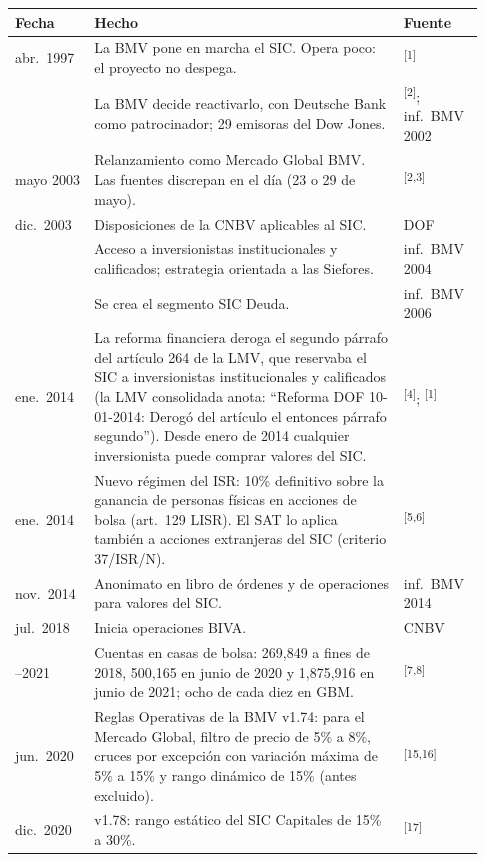 \documentclass[11pt,letterpaper]{article}
\theoremstyle{definition}
\theoremstyle{plain}
\newcommand{\web}[1]{\textsuperscript{[#1]}}
\begin{document}
\begin{center}\small
\begin{longtable}{@{}>{\raggedright\arraybackslash}p{0.15\linewidth}>{\raggedright\arraybackslash}p{0.62\linewidth}>{\raggedright\arraybackslash}p{0.16\linewidth}@{}}\toprule
Fecha & Hecho & Fuente\\\midrule\endhead
14 abr.\ 1997 & La BMV pone en marcha el SIC. Opera poco: el proyecto no despega. & \web{1}\\
2002 & La BMV decide reactivarlo, con Deutsche Bank como patrocinador; 29 emisoras del Dow Jones. & \web{2}; inf.\ BMV 2002\\
mayo 2003 & Relanzamiento como Mercado Global BMV. Las fuentes discrepan en el día (23 o 29 de mayo). & \web{2,3}\\
18 dic.\ 2003 & Disposiciones de la CNBV aplicables al SIC. & DOF\\
2004 & Acceso a inversionistas institucionales y calificados; estrategia orientada a las Siefores. & inf.\ BMV 2004\\
2006 & Se crea el segmento SIC Deuda. & inf.\ BMV 2006\\
10 ene.\ 2014 & La reforma financiera deroga el segundo párrafo del artículo 264 de la LMV, que reservaba el SIC a inversionistas institucionales y calificados (la LMV consolidada anota: ``Reforma DOF 10-01-2014: Derogó del artículo el entonces párrafo segundo''). Desde enero de 2014 cualquier inversionista puede comprar valores del SIC. & \web{4}; \web{1}\\
1 ene.\ 2014 & Nuevo régimen del ISR: 10\% definitivo sobre la ganancia de personas físicas en acciones de bolsa (art.\ 129 LISR). El SAT lo aplica también a acciones extranjeras del SIC (criterio 37/ISR/N). & \web{5,6}\\
nov.\ 2014 & Anonimato en libro de órdenes y de operaciones para valores del SIC. & inf.\ BMV 2014\\
25 jul.\ 2018 & Inicia operaciones BIVA. & CNBV\\
2018--2021 & Cuentas en casas de bolsa: 269,849 a fines de 2018, 500,165 en junio de 2020 y 1,875,916 en junio de 2021; ocho de cada diez en GBM. & \web{7,8}\\
15 jun.\ 2020 & Reglas Operativas de la BMV v1.74: para el Mercado Global, filtro de precio de 5\% a 8\%, cruces por excepción con variación máxima de 5\% a 15\% y rango dinámico de 15\% (antes excluido). & \web{15,16}\\
16 dic.\ 2020 & v1.78: rango estático del SIC Capitales de 15\% a 30\%. & \web{17}\\

\end{longtable}
\end{center}
\end{document}
